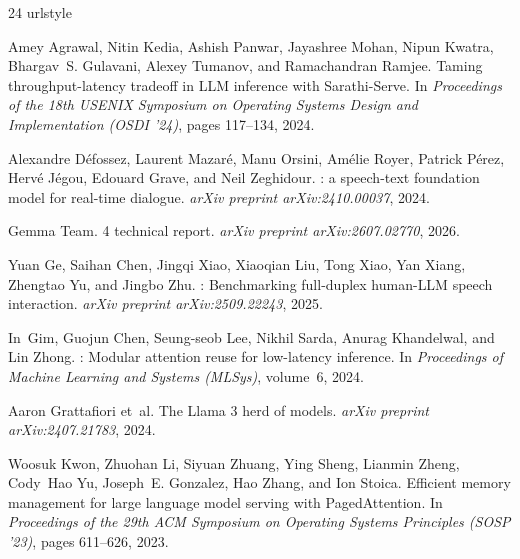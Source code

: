 \documentclass{article}
\begin{document}
\begin{thebibliography}{24}
\providecommand{\natexlab}[1]{#1}
\providecommand{\url}[1]{\texttt{#1}}
\expandafter\ifx\csname urlstyle\endcsname\relax
  \providecommand{\doi}[1]{doi: #1}\else
  \providecommand{\doi}{doi: \begingroup \urlstyle{rm}\Url}\fi

Amey Agrawal, Nitin Kedia, Ashish Panwar, Jayashree Mohan, Nipun Kwatra, Bhargav~S. Gulavani, Alexey Tumanov, and Ramachandran Ramjee.
\newblock Taming throughput-latency tradeoff in {LLM} inference with {Sarathi-Serve}.
\newblock In \emph{Proceedings of the 18th USENIX Symposium on Operating Systems Design and Implementation (OSDI '24)}, pages 117--134, 2024.

Alexandre D{\'e}fossez, Laurent Mazar{\'e}, Manu Orsini, Am{\'e}lie Royer, Patrick P{\'e}rez, Herv{\'e} J{\'e}gou, Edouard Grave, and Neil Zeghidour.
: a speech-text foundation model for real-time dialogue.
\newblock \emph{arXiv preprint arXiv:2410.00037}, 2024.

{Gemma Team}.
 4 technical report.
\newblock \emph{arXiv preprint arXiv:2607.02770}, 2026.

Yuan Ge, Saihan Chen, Jingqi Xiao, Xiaoqian Liu, Tong Xiao, Yan Xiang, Zhengtao Yu, and Jingbo Zhu.
: Benchmarking full-duplex human-{LLM} speech interaction.
\newblock \emph{arXiv preprint arXiv:2509.22243}, 2025.

In~Gim, Guojun Chen, Seung-seob Lee, Nikhil Sarda, Anurag Khandelwal, and Lin Zhong.
: Modular attention reuse for low-latency inference.
\newblock In \emph{Proceedings of Machine Learning and Systems (MLSys)}, volume~6, 2024.

Aaron Grattafiori et~al.
\newblock The {Llama} 3 herd of models.
\newblock \emph{arXiv preprint arXiv:2407.21783}, 2024.

Woosuk Kwon, Zhuohan Li, Siyuan Zhuang, Ying Sheng, Lianmin Zheng, Cody~Hao Yu, Joseph~E. Gonzalez, Hao Zhang, and Ion Stoica.
\newblock Efficient memory management for large language model serving with {PagedAttention}.
\newblock In \emph{Proceedings of the 29th ACM Symposium on Operating Systems Principles (SOSP '23)}, pages 611--626, 2023.


\end{thebibliography}
\end{document}
